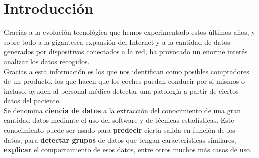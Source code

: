 \chapter{Introducción}
Gracias a la evolución tecnológica que hemos experimentado estos últimos años, y sobre todo a la gigantesca expansión del Internet y a la cantidad de datos generados por dispositivos conectados a la red, ha provocado un enorme interés analizar los datos recogidos.\\
Gracias a esta información es los que nos identifican como posibles compradores de un producto, los que hacen que los coches puedan conducir por si mismos o incluso, ayuden al personal médico detectar una patología a partir de ciertos datos del paciente.\\
\linebreak
Se denomina \textbf{ciencia de datos} a la extracción del conocimiento de una gran cantidad datos mediante el uso del software y de técnicas estadísticas. Este conocimiento puede ser usado para \textbf{predecir} cierta salida en función de los datos, para \textbf{detectar grupos} de datos que tengan características similares, \textbf{explicar} el comportamiento de esos datos, entre otros muchos más casos de uso. \\\linebreak
